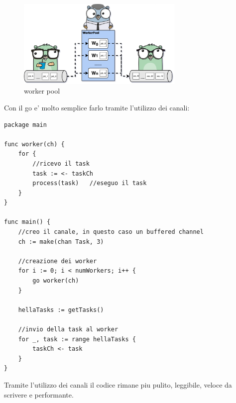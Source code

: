 \begin{figure}[h!]
    \centering
    \includegraphics[width=8cm]{sections/worker-pool.png}
    \caption{worker pool}
    \label{fig:my_label}
\end{figure}

Con il go e' molto semplice farlo tramite l'utilizzo dei canali: \newline

\begin{lstlisting}
package main

func worker(ch) {
    for {
        //ricevo il task
        task := <- taskCh
        process(task)   //eseguo il task
    }
}

func main() {
    //creo il canale, in questo caso un buffered channel
    ch := make(chan Task, 3)
    
    //creazione dei worker
    for i := 0; i < numWorkers; i++ {
        go worker(ch)
    }
    
    hellaTasks := getTasks()
    
    //invio della task al worker
    for _, task := range hellaTasks {
        taskCh <- task
    }
}
\end{lstlisting}

Tramite l'utilizzo dei canali il codice rimane piu pulito, leggibile, veloce da scrivere e performante.

